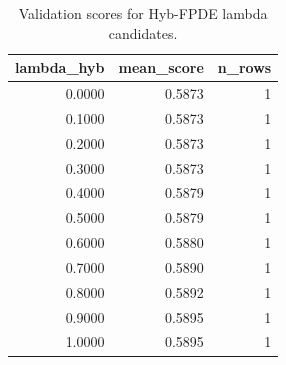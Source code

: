 \begin{table}[t]
\caption{Validation scores for Hyb-FPDE lambda candidates.}
\label{tab:lambda_distribution_computed}
\centering
\begin{tabular}{rrr}
\toprule
lambda\_hyb & mean\_score & n\_rows \\
\midrule
0.0000 & 0.5873 & 1 \\
0.1000 & 0.5873 & 1 \\
0.2000 & 0.5873 & 1 \\
0.3000 & 0.5873 & 1 \\
0.4000 & 0.5879 & 1 \\
0.5000 & 0.5879 & 1 \\
0.6000 & 0.5880 & 1 \\
0.7000 & 0.5890 & 1 \\
0.8000 & 0.5892 & 1 \\
0.9000 & 0.5895 & 1 \\
1.0000 & 0.5895 & 1 \\
\bottomrule
\end{tabular}

\end{table}
